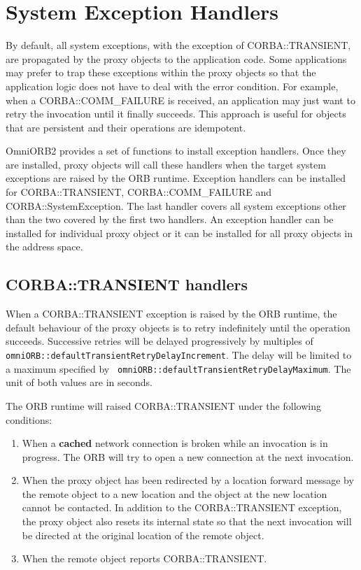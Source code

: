 \documentclass[11pt,twoside,onecolumn]{book}
\begin{document}
\section{System Exception Handlers}

By default, all system exceptions, with the exception of CORBA::TRANSIENT,
are propagated by the proxy objects to the application code. Some
applications may prefer to trap these exceptions within the proxy objects so
that the application logic does not have to deal with the error
condition. For example, when a CORBA::COMM\_FAILURE is received, an
application may just want to retry the invocation until it finally
succeeds. This approach is useful for objects that are persistent and their
operations are idempotent.

OmniORB2 provides a set of functions to install exception handlers. Once
they are installed, proxy objects will call these handlers when the target
system exceptions are raised by the ORB runtime. Exception handlers can be
installed for CORBA::TRANSIENT, CORBA::COMM\_FAILURE and
CORBA::SystemException. The last handler covers all system exceptions other
than the two covered by the first two handlers. An exception handler can be
installed for individual proxy object or it can be installed for all proxy
objects in the address space.


\subsection{CORBA::TRANSIENT handlers}

When a CORBA::TRANSIENT exception is raised by the ORB runtime, the default
behaviour of the proxy objects is to retry indefinitely until the operation
succeeds. Successive retries will be delayed progressively by multiples of
{\tt omniORB::defaultTransientRetryDelayIncrement}. The delay will be
limited to a maximum specified by {\tt
omniORB::defaultTransientRetryDelayMaximum}. The unit of both values are in
seconds.

The ORB runtime will raised CORBA::TRANSIENT under the following
conditions:

\begin{enumerate}

\item When a {\bf cached} network connection is broken while an invocation
is in progress. The ORB will try to open a new connection at the next
invocation. 

\item When the proxy object has been redirected by a location forward
message by the remote object to a new location and the object at the new
location cannot be contacted. In addition to the CORBA::TRANSIENT
exception, the proxy object also resets its internal state so that the next
invocation will be directed at the original location of the remote object.

\item When the remote object reports CORBA::TRANSIENT. 

\end{enumerate}
\end{document}

